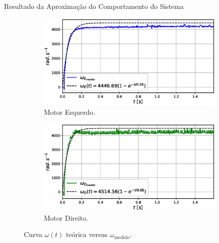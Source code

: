 \begin{frame}{Resultado da Aproximação do Comportamento do Sistema}


\begin{figure}
    \begin{subfigure}{.48\textwidth}
        \centering
        \includegraphics[width=1.15\textwidth]{figuras/resultados/exp02/regressao_vs_medido_esquerdo100.eps}
        \caption{Motor Esquerdo.}
    \end{subfigure}
    \begin{subfigure}{.48\textwidth}
        \centering
        \includegraphics[width=1.15\textwidth]{figuras/resultados/exp02/regressao_vs_medido_direito100.eps}
        \caption{Motor Direito.}
    \end{subfigure}
    \caption{Curva $\omega(t)$ teórica versus $\omega_{\text{medido}}$.}
\end{figure}
    
\end{frame}



